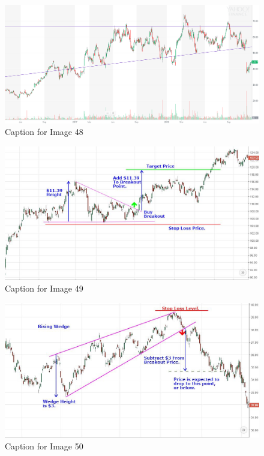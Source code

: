 \documentclass{article}
\begin{document}
\vspace{10pt}

\begin{figure}[!htb]
    \centering
    \includegraphics[width=\textwidth]{imgs/48.png}
    \caption{Caption for Image 48}
\end{figure}

\vspace{10pt}

\begin{figure}[!htb]
    \centering
    \includegraphics[width=\textwidth]{imgs/49.png}
    \caption{Caption for Image 49}
\end{figure}

\vspace{10pt}

\begin{figure}[!htb]
    \centering
    \includegraphics[width=\textwidth]{imgs/50.png}
    \caption{Caption for Image 50}
\end{figure}
\end{document}
